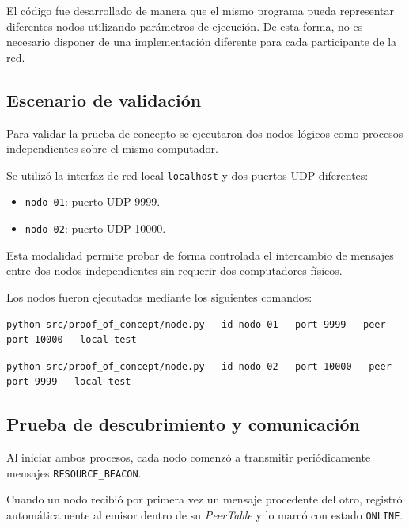 \documentclass{article}
\begin{document}
El código fue desarrollado de manera que el mismo programa pueda representar diferentes nodos utilizando parámetros de ejecución. De esta forma, no es necesario disponer de una implementación diferente para cada participante de la red.

\subsection{Escenario de validación}

Para validar la prueba de concepto se ejecutaron dos nodos lógicos como procesos independientes sobre el mismo computador.

Se utilizó la interfaz de red local \texttt{localhost} y dos puertos UDP diferentes:

\begin{itemize}
    \item \texttt{nodo-01}: puerto UDP 9999.
    \item \texttt{nodo-02}: puerto UDP 10000.
\end{itemize}

Esta modalidad permite probar de forma controlada el intercambio de mensajes entre dos nodos independientes sin requerir dos computadores físicos.

Los nodos fueron ejecutados mediante los siguientes comandos:

\begin{lstlisting}[caption={Ejecución del nodo 01}]
python src/proof_of_concept/node.py --id nodo-01 --port 9999 --peer-port 10000 --local-test
\end{lstlisting}

\begin{lstlisting}[caption={Ejecución del nodo 02}]
python src/proof_of_concept/node.py --id nodo-02 --port 10000 --peer-port 9999 --local-test
\end{lstlisting}

\subsection{Prueba de descubrimiento y comunicación}

Al iniciar ambos procesos, cada nodo comenzó a transmitir periódicamente mensajes \texttt{RESOURCE\_BEACON}.

Cuando un nodo recibió por primera vez un mensaje procedente del otro, registró automáticamente al emisor dentro de su \textit{PeerTable} y lo marcó con estado \texttt{ONLINE}.
\end{document}
